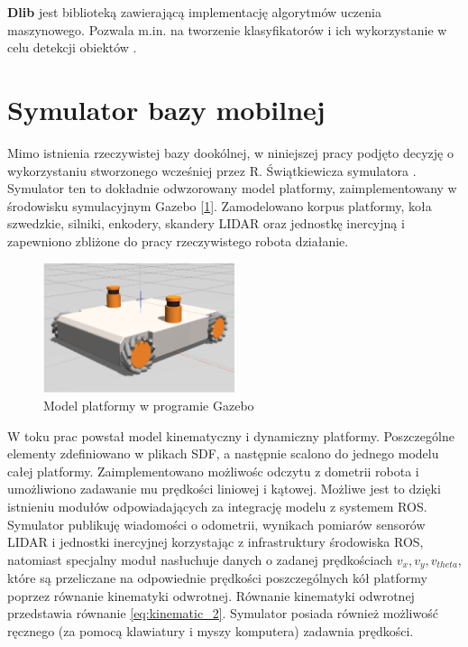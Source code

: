 {\textbf{Dlib}} jest biblioteką zawierającą implementację algorytmów uczenia maszynowego. Pozwala m.in. na tworzenie klasyfikatorów i ich wykorzystanie w celu detekcji obiektów \cite{dlib}.

\section{Symulator bazy mobilnej}

Mimo istnienia rzeczywistej bazy dookólnej, w niniejszej pracy podjęto decyzję o wykorzystaniu stworzonego wcześniej przez R. Świątkiewicza symulatora \cite{omnivelma}. Symulator ten to dokładnie odwzorowany model platformy, zaimplementowany w środowisku symulacyjnym Gazebo [\ref{fig:omnivelma_gaz}]. Zamodelowano korpus platformy, koła szwedzkie, silniki, enkodery, skandery LIDAR oraz jednostkę inercyjną i zapewniono zbliżone do pracy rzeczywistego robota działanie.

\begin{figure}[H]
	\centering
	\includegraphics[width=0.5\textwidth]{gfx/omnidirectional.png}
	\caption{Model platformy w programie Gazebo \cite{omnivelma}}
	\label{fig:omnivelma_gaz}
\end{figure}

W toku prac powstał model kinematyczny i dynamiczny platformy. Poszczególne elementy zdefiniowano w plikach SDF, a następnie scalono do jednego modelu całej platformy. Zaimplementowano możliwośc odczytu z dometrii robota i umożliwiono zadawanie mu prędkości liniowej i kątowej. Możliwe jest to dzięki istnieniu modułów odpowiadających za integrację modelu z systemem ROS. Symulator publikuję wiadomości o odometrii, wynikach pomiarów sensorów LIDAR i jednostki inercyjnej korzystając z infrastruktury środowiska ROS, natomiast specjalny moduł nasłuchuje danych o zadanej prędkościach $v_{x}, v_{y}, v_{theta}$, które są przeliczane na odpowiednie prędkości poszczególnych kół platformy poprzez równanie kinematyki odwrotnej. Równanie kinematyki odwrotnej przedstawia równanie \eqref{eq:kinematic_2}. Symulator posiada również możliwość ręcznego (za pomocą klawiatury i myszy komputera) zadawnia prędkości.

